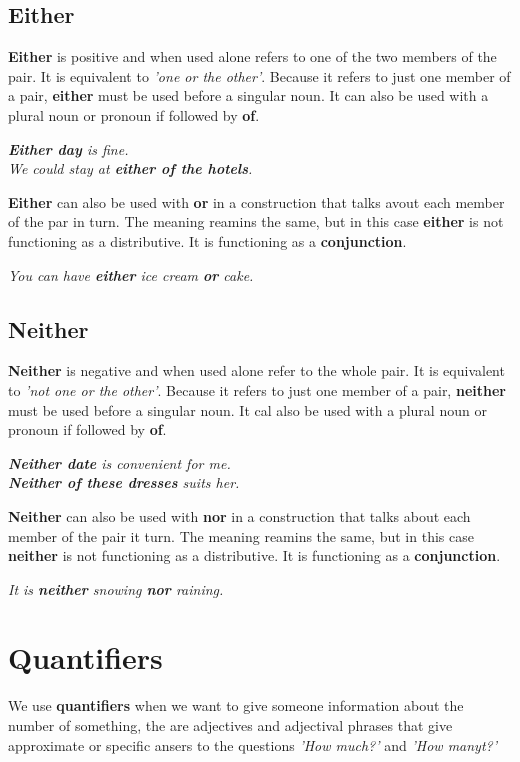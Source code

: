 \documentclass[hidelinks,10pt,a4paper]{article}
\begin{document}
\subsection{Either}
\textbf{Either} is positive and when used alone refers to one of the two members of the pair. It is equivalent to \textit{'one or the other'}. Because it refers to just one member of a pair, \textbf{either} must be used before a singular noun. It can also be used with a plural noun or pronoun if followed by \textbf{of}.
\begin{center}
		\textit{ \textbf{Either day} is fine.\\
		We could stay at \textbf{either of the hotels}.}
\end{center}
\textbf{Either} can also be used with \textbf{or} in a construction that talks avout each member of the par in turn. The meaning reamins the same, but in this case \textbf{either} is not functioning as a distributive. It is functioning as a \textbf{conjunction}.
\begin{center}
\textit{ You can have \textbf{either} ice cream \textbf{or} cake.}
\end{center}

\subsection{Neither}
\textbf{Neither} is negative and when used alone refer to the whole pair. It is equivalent to \textit{'not one or the other'}. Because it refers to just one member of a pair, \textbf{neither} must be used before a singular noun. It cal also be used with a plural noun or pronoun if followed by \textbf{of}.
\begin{center}
\textit{ \textbf{Neither date} is convenient for me.\\
\textbf{Neither of these dresses} suits her.}
\end{center}
\textbf{Neither} can also be used with \textbf{nor} in a construction that talks about each member of the pair it turn. The meaning reamins the same, but in this case \textbf{neither} is not functioning as a distributive. It is functioning as a \textbf{conjunction}.
\begin{center}
\textit{ It is \textbf{neither} snowing \textbf{nor} raining.}
\end{center}

\newpage
\section{Quantifiers}
We use \textbf{quantifiers} when we want to give someone information about the number of something, the are adjectives and adjectival phrases that give approximate or specific ansers to the questions \textit{'How much?'} and \textit{'How manyt?'}
\end{document}
